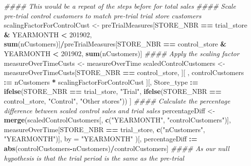 \documentclass[
]{article}
\newenvironment{Shaded}{\begin{snugshade}}{\end{snugshade}}
\newcommand{\CommentTok}[1]{\textcolor[rgb]{0.56,0.35,0.01}{\textit{#1}}}
\newcommand{\DataTypeTok}[1]{\textcolor[rgb]{0.13,0.29,0.53}{#1}}
\newcommand{\DecValTok}[1]{\textcolor[rgb]{0.00,0.00,0.81}{#1}}
\newcommand{\ErrorTok}[1]{\textcolor[rgb]{0.64,0.00,0.00}{\textbf{#1}}}
\newcommand{\KeywordTok}[1]{\textcolor[rgb]{0.13,0.29,0.53}{\textbf{#1}}}
\newcommand{\NormalTok}[1]{#1}
\newcommand{\OperatorTok}[1]{\textcolor[rgb]{0.81,0.36,0.00}{\textbf{#1}}}
\newcommand{\StringTok}[1]{\textcolor[rgb]{0.31,0.60,0.02}{#1}}
\begin{document}
\begin{Shaded}
\begin{Highlighting}[]
\CommentTok{#### This would be a repeat of the steps before for total sales}
\CommentTok{#### Scale pre-trial control customers to match pre-trial trial store customers}
\NormalTok{scalingFactorForControlCust <-}\StringTok{ }\NormalTok{preTrialMeasures[STORE_NBR }\OperatorTok{==}\StringTok{ }\NormalTok{trial_store }\OperatorTok{&}
\NormalTok{YEARMONTH }\OperatorTok{<}\StringTok{ }\DecValTok{201902}\NormalTok{, }\KeywordTok{sum}\NormalTok{(nCustomers)]}\OperatorTok{/}\NormalTok{preTrialMeasures[STORE_NBR }\OperatorTok{==}\StringTok{ }\NormalTok{control_store }\OperatorTok{&}
\NormalTok{YEARMONTH }\OperatorTok{<}\StringTok{ }\DecValTok{201902}\NormalTok{, }\KeywordTok{sum}\NormalTok{(nCustomers)]}
\CommentTok{#### Apply the scaling factor}
\NormalTok{measureOverTimeCusts <-}\StringTok{ }\NormalTok{measureOverTime}
\NormalTok{scaledControlCustomers <-}\StringTok{ }\NormalTok{measureOverTimeCusts[STORE_NBR }\OperatorTok{==}\StringTok{ }\NormalTok{control_store,}
\NormalTok{                                            ][ , controlCustomers }\OperatorTok{:}\ErrorTok{=}\StringTok{ }\NormalTok{nCustomers}
\OperatorTok{*}\StringTok{ }\NormalTok{scalingFactorForControlCust}
\NormalTok{                                            ][, Store_type }\OperatorTok{:}\ErrorTok{=}\StringTok{ }\KeywordTok{ifelse}\NormalTok{(STORE_NBR}
\OperatorTok{==}\StringTok{ }\NormalTok{trial_store, }\StringTok{"Trial"}\NormalTok{,}
                                      \KeywordTok{ifelse}\NormalTok{(STORE_NBR }\OperatorTok{==}\StringTok{ }\NormalTok{control_store,}
\StringTok{"Control"}\NormalTok{, }\StringTok{"Other stores"}\NormalTok{))}
\NormalTok{]}
\CommentTok{#### Calculate the percentage difference between scaled control sales and trial sales}
\NormalTok{percentageDiff <-}\StringTok{ }\KeywordTok{merge}\NormalTok{(scaledControlCustomers[, }\KeywordTok{c}\NormalTok{(}\StringTok{"YEARMONTH"}\NormalTok{,}
\StringTok{"controlCustomers"}\NormalTok{)],}
\NormalTok{                        measureOverTime[STORE_NBR }\OperatorTok{==}\StringTok{ }\NormalTok{trial_store, }\KeywordTok{c}\NormalTok{(}\StringTok{"nCustomers"}\NormalTok{,}
\StringTok{"YEARMONTH"}\NormalTok{)],}
                        \DataTypeTok{by =} \StringTok{"YEARMONTH"}
\NormalTok{                        )[, percentageDiff }\OperatorTok{:}\ErrorTok{=}
\KeywordTok{abs}\NormalTok{(controlCustomers}\OperatorTok{-}\NormalTok{nCustomers)}\OperatorTok{/}\NormalTok{controlCustomers]}
\CommentTok{#### As our null hypothesis is that the trial period is the same as the pre-trial }

\end{Highlighting}
\end{Shaded}
\end{document}
